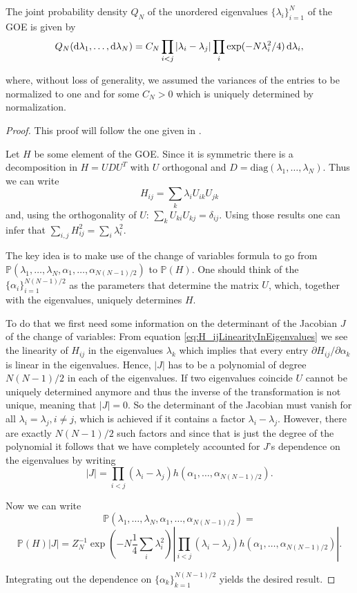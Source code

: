 \begin{theorem}\label{thm:probabilitydensityofEV}
	The joint probability density $Q_N$ of the unordered eigenvalues $\{\lambda_i\}_{i=1}^N$ of the GOE is given by
	$$Q_N(\mathop{}\!\mathrm{d}\lambda_1,\dots,\mathop{}\!\mathrm{d}\lambda_N) = C_N\prod_{i<j}|\lambda_i-\lambda_j|\prod_i\exp(-N\lambda_i^2/4)\mathop{}\!\mathrm{d}\lambda_i,$$
	
	where, without loss of generality, we assumed the variances of the entries to be normalized to one and for some $C_N>0$ which is uniquely determined by normalization.
\end{theorem}
\begin{proof}
	This proof will follow the one given in \cite{LiuEigenvalues}.
	
	Let $H$ be some element of the GOE. Since it is symmetric there is a decomposition in $H=UDU^T$ with $U$ orthogonal and $D=\text{diag}(\lambda_1,\dots,\lambda_N)$. Thus we can write 
	\begin{equation}\label{eq:H_ijLinearityInEigenvalues}
		H_{ij} = \sum_k \lambda_i U_{ik}U_{jk}
	\end{equation}	
	and, using the orthogonality of $U$: $\sum_k U_{ki}U_{kj}=\delta_{ij}$. Using those results one can infer that $\sum_{i,j}H_{ij}^2=\sum_i \lambda_i^2$.
	
	The key idea is to make use of the change of variables formula to go from $\mathbb P(\lambda_1,\dots,\lambda_N,\alpha_1,\dots,\alpha_{N(N-1)/2})$ to $\mathbb P(H)$. One should think of the $\{\alpha_i\}_{i=1}^{N(N-1)/2}$ as the parameters that determine the matrix $U$, which, together with the eigenvalues, uniquely determines $H$.
	
	To do that we first need some information on the determinant of the Jacobian $J$ of the change of variables:
	From equation \ref{eq:H_ijLinearityInEigenvalues} we see the linearity of $H_{ij}$ in the eigenvalues $\lambda_k$ which implies that every entry $\partial H_{ij}/\partial\alpha_k$ is linear in the eigenvalues. Hence, $|J|$ has to be a polynomial of degree $N(N-1)/2$ in each of the eigenvalues. If two eigenvalues coincide $U$ cannot be uniquely determined anymore and thus the inverse of the transformation is not unique, meaning that $|J|=0$. So the determinant of the Jacobian must vanish for all $\lambda_i=\lambda_j, i\neq j$, which is achieved if it contains a factor $\lambda_i-\lambda_j$. However, there are exactly $N(N-1)/2$ such factors and since that is just the degree of the polynomial it follows that we have completely accounted for $J$'s dependence on the eigenvalues by writing $$|J|=\prod_{i<j}(\lambda_i-\lambda_j) h(\alpha_1,\dots,\alpha_{N(N-1)/2}).$$
	
	Now we can write
	$$\mathbb P(\lambda_1,\dots,\lambda_N,\alpha_1,\dots,\alpha_{N(N-1)/2}) = $$
	$$\mathbb P(H)|J|=Z_N^{-1}\exp\left(-N\frac{1}{4}\sum_i\lambda_i^2\right)|\prod_{i<j}(\lambda_i-\lambda_j) h(\alpha_1,\dots,\alpha_{N(N-1)/2})|.$$
	
	Integrating out the dependence on $\{\alpha_k\}_{k=1}^{N(N-1)/2}$ yields the desired result.
\end{proof}

